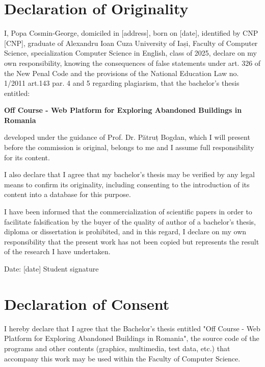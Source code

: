 \documentclass[12pt,a4paper]{report}
\begin{document}
\chapter*{Declaration of Originality}

I, Popa Cosmin-George, domiciled in [address], born on [date], identified by CNP [CNP], graduate of Alexandru Ioan Cuza University of Iași, Faculty of Computer Science, specialization Computer Science in English, class of 2025, declare on my own responsibility, knowing the consequences of false statements under art. 326 of the New Penal Code and the provisions of the National Education Law no. 1/2011 art.143 par. 4 and 5 regarding plagiarism, that the bachelor's thesis entitled:

\textbf{Off Course - Web Platform for Exploring Abandoned Buildings in Romania}

developed under the guidance of Prof. Dr. Pătruț Bogdan, which I will present before the commission is original, belongs to me and I assume full responsibility for its content.

I also declare that I agree that my bachelor's thesis may be verified by any legal means to confirm its originality, including consenting to the introduction of its content into a database for this purpose.

I have been informed that the commercialization of scientific papers in order to facilitate falsification by the buyer of the quality of author of a bachelor's thesis, diploma or dissertation is prohibited, and in this regard, I declare on my own responsibility that the present work has not been copied but represents the result of the research I have undertaken.

\vspace{2cm}
Date: [date] \hfill Student signature

\newpage

\chapter*{Declaration of Consent}

I hereby declare that I agree that the Bachelor's thesis entitled "Off Course - Web Platform for Exploring Abandoned Buildings in Romania", the source code of the programs and other contents (graphics, multimedia, test data, etc.) that accompany this work may be used within the Faculty of Computer Science.
\end{document}

